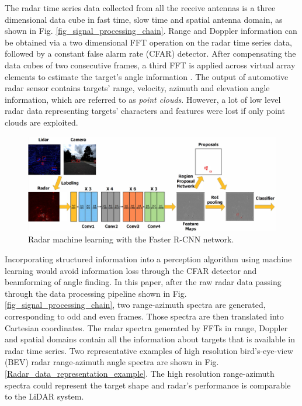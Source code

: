 \documentclass[conference]{IEEEtran}
\begin{document}
The radar time series data collected from all the receive antennas is a three  dimensional data cube in  fast time, slow time and spatial antenna domain, as shown in Fig. \ref{fig_signal_processing_chain}. Range and Doppler information can be obtained via a two dimensional FFT operation on the radar time series data, 
followed by a constant false alarm rate (CFAR) detector. 
After compensating the data cubes of two consecutive frames, a third FFT is applied across  virtual array elements
to estimate the target's angle information \cite{SUN_SPM_Feature_Article_2020}. The output of automotive radar sensor contains targets' range, velocity, azimuth and elevation angle information, which are referred to as  \emph{point clouds}.
However, a lot of low level radar data representing targets' characters and features were lost if only point clouds are exploited.

\begin{figure}[h]
\centering
\includegraphics[width=3.5 in ]{pic/machine_learningv2.png}

\caption{\label{fig_radar_ML} Radar machine learning with the Faster R-CNN network.}
\end{figure}
\vspace{-3mm}
Incorporating  structured information into a perception algorithm using machine learning would avoid information loss through the CFAR detector and beamforming of angle finding. In this paper, after the raw radar data passing through the data processing pipeline shown in Fig. \ref{fig_signal_processing_chain}, two range-azimuth spectra are generated, corresponding to odd and even frames. Those spectra are then translated into Cartesian coordinates. The radar spectra generated by FFTs in range, Doppler and spatial domains contain all the information about targets that is available in radar time series. Two representative examples of high resolution bird's-eye-view (BEV) radar range-azimuth angle spectra are shown in Fig. \ref{Radar_data_representation_example}. The high resolution range-azimuth spectra could represent the target shape and radar's performance is comparable to the LiDAR system. 
\end{document}
